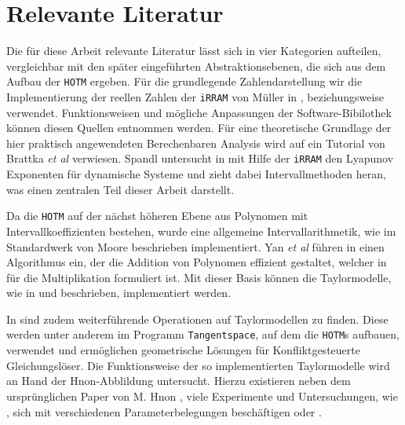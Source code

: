 \section{Relevante Literatur}
Die für diese Arbeit relevante Literatur lässt sich in vier Kategorien aufteilen, vergleichbar mit den später eingeführten Abstraktionsebenen, die sich aus dem Aufbau der \verb+HOTM+ ergeben. Für die grundlegende Zahlendarstellung wir die Implementierung der reellen Zahlen der \verb+iRRAM+ von Müller in \cite{Mller2009EnhancingIE}, beziehungsweise \cite{mueller2001} verwendet. Funktionsweisen und mögliche Anpassungen der Software-Bibilothek können diesen Quellen entnommen werden. Für eine theoretische Grundlage der hier praktisch angewendeten Berechenbaren Analysis wird auf ein Tutorial von Brattka \textit{et al} \cite{Brattka2008} verwiesen. Spandl untersucht in \cite{DBLP:spandl} mit Hilfe der \verb+iRRAM+ den Lyapunov Exponenten für dynamische Systeme und zieht dabei Intervallmethoden heran, was einen zentralen Teil dieser Arbeit darstellt. 

Da die \verb+HOTM+ auf der nächst höheren Ebene aus Polynomen mit Intervallkoeffizienten bestehen, wurde eine allgemeine Intervallarithmetik, wie im Standardwerk von Moore \cite{moore1979} beschrieben implementiert. Yan \textit{et al} führen in \cite{geobuckets} einen Algorithmus ein, der die Addition von Polynomen effizient gestaltet, welcher in \cite{geobucketsmulti} für die Multiplikation formuliert ist. Mit dieser Basis können die Taylormodelle, wie in \cite{makino2001} und \cite{DBLP:conf/macis/BrausseKM15} beschrieben, implementiert werden.

In \cite{DBLP:conf/macis/BrausseKM15} sind zudem weiterführende Operationen auf Taylormodellen zu finden. Diese werden unter anderem im Programm \verb+Tangentspace+, auf dem die \verb+HOTM+s aufbauen, verwendet und ermöglichen geometrische Lösungen für Konfliktgesteuerte Gleichungslöser. Die Funktionsweise der so implementierten Taylormodelle wird an Hand der H\e non-Abblildung untersucht. Hierzu existieren neben dem ursprünglichen Paper von M. H\e non \cite{henon1976}, viele Experimente und Untersuchungen, wie , sich mit verschiedenen Parameterbelegungen beschäftigen oder .






